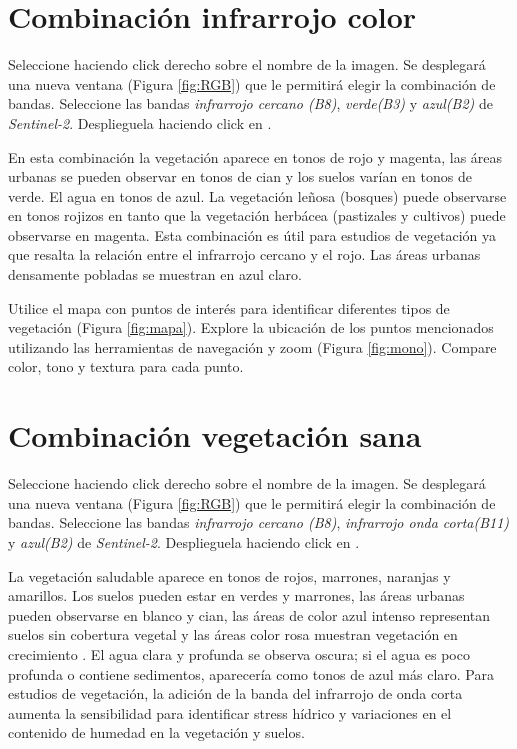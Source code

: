 \section{Combinación infrarrojo color}
\label{sec:infrarrojocolor}

Seleccione  haciendo click derecho sobre el nombre de la imagen. Se desplegará una nueva ventana (Figura \ref{fig:RGB}) que le permitirá elegir la combinación de bandas. Seleccione las bandas \emph{infrarrojo cercano (B8)}, \emph{verde(B3)} y \emph{azul(B2)} de \emph{Sentinel-2}. Desplieguela haciendo click en . 

En esta combinación la vegetación aparece en tonos de rojo y magenta, las áreas urbanas se pueden observar en tonos de cian y los suelos varían en tonos de verde. El agua en tonos de azul. La vegetación leñosa (bosques) puede observarse en tonos rojizos en tanto que la vegetación herbácea (pastizales y cultivos) puede observarse en magenta. Esta combinación es útil para estudios de vegetación ya que resalta la relación entre el infrarrojo cercano y el rojo. Las áreas urbanas densamente pobladas se muestran en azul claro. 

Utilice el mapa con puntos de interés para identificar diferentes tipos de vegetación (Figura \ref{fig:mapa}). Explore la ubicación de los puntos mencionados utilizando las herramientas de navegación y zoom  (Figura \ref{fig:mono}). Compare color, tono y textura para cada punto. 

\section{Combinación vegetación sana}
\label{sec:vegetacionsana}

Seleccione  haciendo click derecho sobre el nombre de la imagen. Se desplegará una nueva ventana (Figura \ref{fig:RGB}) que le permitirá elegir la combinación de bandas. Seleccione las bandas \emph{infrarrojo cercano (B8)}, \emph{infrarrojo onda corta(B11)} y \emph{azul(B2)} de \emph{Sentinel-2}. Desplieguela haciendo click en . 

La vegetación saludable aparece en tonos de rojos, marrones, naranjas y amarillos. Los suelos pueden estar en verdes y marrones, las áreas urbanas pueden observarse en blanco y cian, las áreas de color azul intenso representan suelos sin cobertura vegetal y las áreas color rosa muestran vegetación en crecimiento . El agua clara y profunda se observa oscura; si el agua es poco profunda o contiene sedimentos, aparecería como tonos de azul más claro. Para estudios de vegetación, la adición de la banda del infrarrojo de onda corta aumenta la sensibilidad para identificar stress hídrico y variaciones en el contenido de humedad en la vegetación y suelos. 

